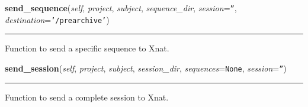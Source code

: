 \hspace{.8\funcindent}\begin{boxedminipage}{\funcwidth}

    \raggedright \textbf{send\_sequence}(\textit{self}, \textit{project}, \textit{subject}, \textit{sequence\_dir}, \textit{session}={\tt ''}, \textit{destination}={\tt '/prearchive'})

    \vspace{-1.5ex}

    \rule{\textwidth}{0.5\fboxrule}
\setlength{\parskip}{2ex}
    Function to send a specific sequence to Xnat.

\setlength{\parskip}{1ex}
    \end{boxedminipage}

    \label{source:Xnat:Xnat:send_session}

    \vspace{0.5ex}

\hspace{.8\funcindent}\begin{boxedminipage}{\funcwidth}

    \raggedright \textbf{send\_session}(\textit{self}, \textit{project}, \textit{subject}, \textit{session\_dir}, \textit{sequences}={\tt None}, \textit{session}={\tt ''})

    \vspace{-1.5ex}

    \rule{\textwidth}{0.5\fboxrule}
\setlength{\parskip}{2ex}
    Function to send a complete session to Xnat.

\setlength{\parskip}{1ex}
    \end{boxedminipage}

